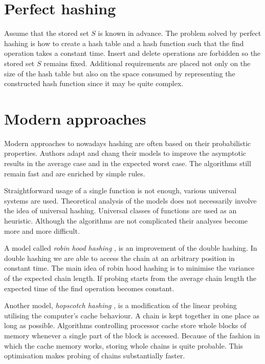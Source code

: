 \section{Perfect hashing}
Assume that the stored set $S$ is known in advance. The problem solved by perfect hashing is how to create a hash table and a hash function such that the find operation takes a constant time. Insert and delete operations are forbidden so the stored set $S$ remains fixed. Additional requirements are placed not only on the size of the hash table but also on the space consumed by representing the constructed hash function since it may be quite complex.

\section{Modern approaches}
Modern approaches to nowadays hashing are often based on their probabilistic properties. Authors adapt and chang their models to improve the asymptotic results in the average case and in the expected worst case. The algorithms still remain fast and are enriched by simple rules. 

Straightforward usage of a single function is not enough, various universal systems are used. Theoretical analysis of the models does not necessarily involve the idea of universal hashing. Universal classes of functions are used as an heuristic. Although the algorithms are not complicated their analyses become more and more difficult.

A model called \emph{robin hood hashing} \cite{10.1109/SFCS.1985.48}, \cite{Devroye04onworst} is an improvement of the double hashing. In double hashing we are able to access the chain at an arbitrary position in constant time. The main idea of robin hood hashing is to minimise the variance of the expected chain length. If probing starts from the average chain length the expected time of the find operation becomes constant.

Another model, \emph{hopscotch hashing} \cite{DBLP:conf/wdag/HerlihyST08}, is a modification of the linear probing utilising the computer's cache behaviour. A chain is kept together in one place as long as possible. Algorithms controlling processor cache store whole blocks of memory whenever a single part of the block is accessed. Because of the fashion in which the cache memory works, storing whole chains is quite probable. This optimisation makes probing of chains substantially faster.
